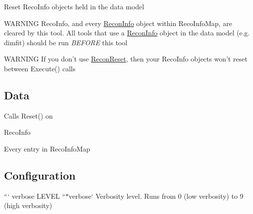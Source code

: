 Reset {\ttfamily Reco\-Info} objects held in the data model


\begin{DoxyItemize}
\item W\-A\-R\-N\-I\-N\-G {\ttfamily Reco\-Info}, and every {\ttfamily \hyperlink{classReconInfo}{Recon\-Info}} object within {\ttfamily Reco\-Info\-Map}, are cleared by this tool. All tools that use a {\ttfamily \hyperlink{classReconInfo}{Recon\-Info}} object in the data model (e.\-g. {\ttfamily dimfit}) should be run {\itshape B\-E\-F\-O\-R\-E} this tool
\item W\-A\-R\-N\-I\-N\-G If you don't use {\ttfamily \hyperlink{classReconReset}{Recon\-Reset}}, then your {\ttfamily Reco\-Info} objects won't reset between {\ttfamily Execute()} calls
\end{DoxyItemize}

\subsection*{Data}


\begin{DoxyItemize}
\item Calls {\ttfamily Reset()} on
\begin{DoxyItemize}
\item {\ttfamily Reco\-Info}
\item Every entry in {\ttfamily Reco\-Info\-Map}
\end{DoxyItemize}
\end{DoxyItemize}

\subsection*{Configuration}

``` verbose L\-E\-V\-E\-L ``{\ttfamily  $\ast$}verbose` Verbosity level. Runs from 0 (low verbosity) to 9 (high verbosity) 